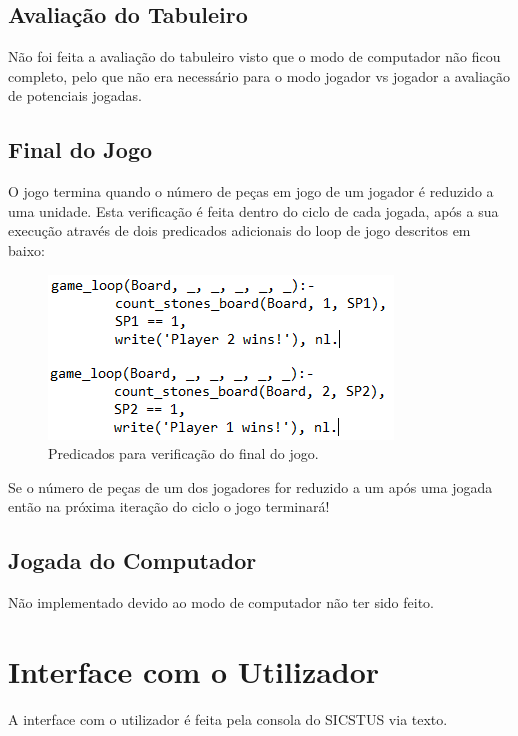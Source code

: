 \documentclass[a4paper]{article}
\begin{document}
\subsection{Avaliação do Tabuleiro} 

Não foi feita a avaliação do  tabuleiro visto que o modo de computador não ficou completo, pelo que não era necessário para o modo jogador vs jogador a avaliação de potenciais jogadas.

\subsection{Final do Jogo} 

O jogo termina quando o número de peças em jogo de um jogador é reduzido a uma unidade. Esta verificação é feita dentro do ciclo de cada jogada, após a sua execução através de dois predicados adicionais do loop de jogo descritos em baixo:

	\begin{figure}[!htb]
	\centering
	\includegraphics[scale=0.8]{images/game_loop.png}
	\caption{Predicados para verificação do final do jogo.}
\end{figure}

Se o número de peças de um dos jogadores for reduzido a um após uma jogada então na próxima iteração do ciclo o jogo terminará!

\subsection{Jogada do Computador} 

Não implementado devido ao modo de computador não ter sido feito.


\section{Interface com o Utilizador}

A interface com o utilizador é feita pela consola do SICSTUS via texto.
\newline
\end{document}
